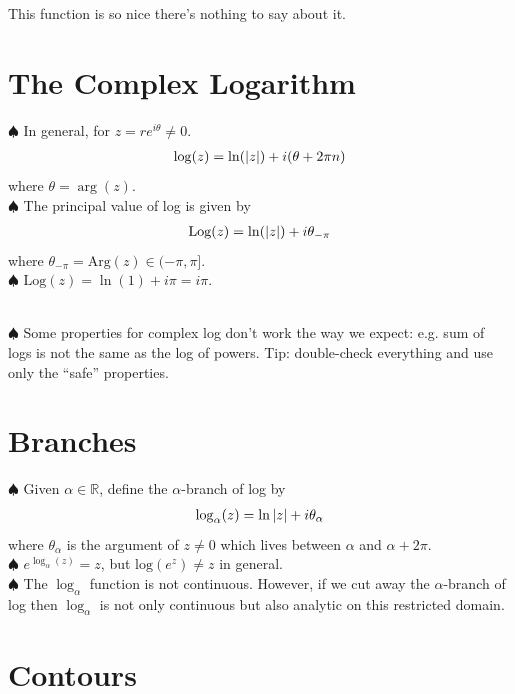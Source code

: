 \documentclass{article}
\theoremstyle{definition}
\newcommand{\R}{\mathbb{R}}
\newcommand{\Arg}{\text{Arg}}
\begin{document}
This function is so nice there's nothing to say about it.

\section{The Complex Logarithm}

\noindent $\spadesuit$ In general, for $z = re^{i\theta} \neq 0$.
\begin{align}
\log(z) = \ln(\abs{z}) + i(\theta + 2\pi n)
\end{align}
where $\theta = \arg(z)$. \\

\noindent $\spadesuit$ The principal value of log is given by
\begin{align}
\text{Log}(z) = \ln(\abs{z}) + i\theta_{-\pi}
\end{align}
where $\theta_{-\pi} = \Arg(z) \in (-\pi ,\pi]$.\\

\noindent $\spadesuit$ $\text{Log}(z) = \ln(1) + i\pi = i\pi$.\\\

\noindent $\spadesuit$ Some properties for complex log don't work the way we expect: e.g. sum of logs is not the same as the log of powers. Tip: double-check everything and use only the ``safe'' properties. 




\section{Branches}

\noindent $\spadesuit$ Given $\alpha \in \R$, define the $\alpha$-branch of log by 
\begin{align}
\log_\alpha(z) = \ln\abs{z} + i\theta_\alpha
\end{align}
where $\theta_\alpha$ is the argument of $z \neq 0$ which lives between $\alpha$ and $\alpha + 2\pi$. \\

\noindent $\spadesuit$ $e^{\log_\alpha(z)} = z$, but $\text{log}(e^z) \neq z$ in general.\\

\noindent $\spadesuit$ The $\log_\alpha$ function is not continuous. However, if we cut away the $\alpha$-branch of log then $\log_\alpha$ is not only continuous but also analytic on this restricted domain. 



\section{Contours}
\end{document}
